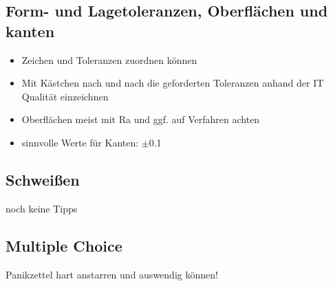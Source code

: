 \documentclass[a4paper,parskip=half*,DIV=7,fontsize=11pt]{scrartcl}
\begin{document}
\subsection{Form- und Lagetoleranzen, Oberflächen und kanten}
\begin{itemize}
	\item Zeichen und Toleranzen zuordnen können
	\item Mit Kästchen nach und nach die geforderten Toleranzen anhand der IT Qualität einzeichnen
	\item Oberflächen meist mit Ra und ggf. auf Verfahren achten
	\item sinnvolle Werte für Kanten: $\pm$0.1
\end{itemize}

\subsection{Schweißen}
noch keine Tipps %

\subsection{Multiple Choice}
Panikzettel hart anstarren und auswendig können!
	
\end{document}
